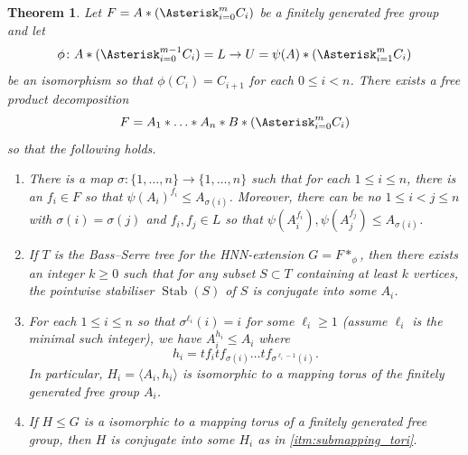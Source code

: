 \documentclass[11pt, a4paper]{amsart}
\newtheorem{theorem}{Theorem}[section]
\theoremstyle{definition}
\DeclareMathOperator{\stab}{Stab}
\begin{document}
\begin{theorem}
\label{thm:acylindrical}
Let $F = A*(\Asterisk_{i=0}^mC_i)$ be a finitely generated free group and let 
\[
\phi\colon A*(\Asterisk_{i=0}^{m-1}C_i) = L \to U = \psi(A)*(\Asterisk_{i=1}^mC_i)
\]
be an isomorphism so that $\phi(C_i) = C_{i+1}$ for each $0\leqslant i<n$. There exists a free product decomposition
\[
F = A_1*\ldots *A_n*B*\left(\Asterisk_{i = 0}^mC_i\right)
\]
so that the following holds.
\begin{enumerate}
\item There is a map $\sigma\colon \{1, \ldots, n\}\to\{1, \ldots, n\}$ such that for each $1\leqslant i\leqslant n$, there is an $f_i\in F$ so that $\psi(A_i)^{f_i} \leqslant A_{\sigma(i)}$. Moreover, there can be no $1\leqslant i< j\leqslant n$ with $\sigma(i) = \sigma(j)$ and $f_i, f_j\in L$ so that $\psi(A_i^{f_i}), \psi(A_j^{f_j})\leqslant A_{\sigma(i)}$.
\item If $T$ is the Bass--Serre tree for the HNN-extension $G = F*_{\phi}$, then there exists an integer $k\geqslant 0$ such that for any subset $S\subset T$ containing at least $k$ vertices, the pointwise stabiliser $\stab(S)$ of $S$ is conjugate into some $A_i$.
\item\label{itm:submapping_tori} For each $1\leqslant i\leqslant n$ so that $\sigma^{\ell_i}(i) = i$ for some $\ell_i\geqslant 1$ (assume $\ell_i$ is the minimal such integer), we have $A_{i}^{h_i}\leqslant A_{i}$ where 
\[
h_i = tf_{i}tf_{\sigma(i)}\ldots tf_{\sigma^{\ell_i-1}(i)}.
\]
In particular, $H_i = \langle A_{i}, h_{i}\rangle$ is isomorphic to a mapping torus of the finitely generated free group $A_{i}$.
\item If $H\leqslant G$ is a isomorphic to a mapping torus of a finitely generated free group, then $H$ is conjugate into some $H_i$ as in \cref{itm:submapping_tori}.
\end{enumerate}
\end{theorem}
\end{document}
